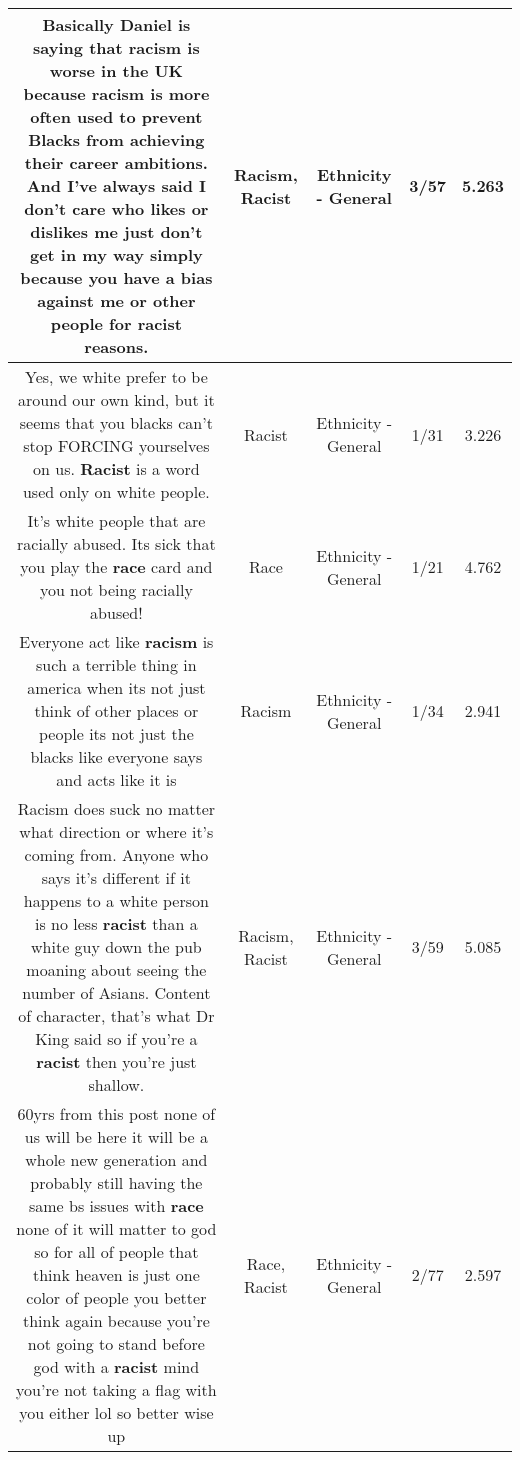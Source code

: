 \documentclass[11pt]{article}
\newlength\mylength
\begin{document}
\begin{center}
\begin{longtable}{|C{.65\mylength}|C{.30\mylength}|C{.12\mylength}|C{.12\mylength}|C{.12\mylength}|}
  \small Basically Daniel is saying that \textbf{racism} is worse in the UK because \textbf{racism} is more often used to prevent Blacks from achieving their career ambitions. And I've always said I don't care who likes or dislikes me just don't get in my way simply because you have a bias against me or other people for \textbf{racist} reasons.\normalsize   & Racism, Racist & Ethnicity - General & 3/57 & 5.263 \\  \hline
  \small Yes,  we white prefer to be around our own kind,   but it seems that you blacks can't stop FORCING yourselves on us.   \textbf{Racist} is a word used only on white people.\normalsize   & Racist & Ethnicity - General & 1/31 & 3.226 \\  \hline
  \small It's white people that are racially abused.  Its sick that you play the \textbf{race} card and you not being racially abused!\normalsize   & Race & Ethnicity - General & 1/21 & 4.762 \\  \hline
  \small Everyone act like \textbf{racism} is such a terrible thing in america when its not just think of other places or people its not just the blacks like everyone says and acts like it is\normalsize   & Racism & Ethnicity - General & 1/34 & 2.941 \\  \hline
  \small Racism does suck no matter what direction or where it's coming from. Anyone who says it's different if it happens to a white person is no less \textbf{racist} than a white guy down the pub moaning about seeing the number of Asians. Content of character, that's what Dr King said so if you're a \textbf{racist} then you're just shallow.\normalsize   & Racism, Racist & Ethnicity - General & 3/59 & 5.085 \\  \hline
  \small 60yrs from this post none of us will be here it will be a whole new generation and probably still having the same bs issues with \textbf{race} none of it will matter to god so for all of people that think heaven is just one color of people you better think again because you're not going to stand before god with a \textbf{racist} mind you're not taking a flag with you either lol so better wise up\normalsize   & Race, Racist & Ethnicity - General & 2/77 & 2.597 \\  \hline

\end{longtable}
\end{center}
\end{document}
